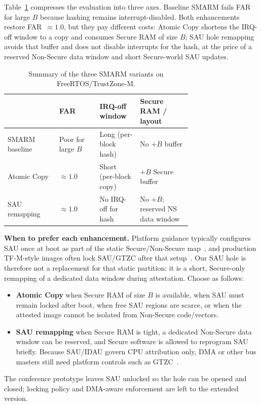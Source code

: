 \documentclass[conference]{IEEEtran}
\begin{document}
Table~\ref{tab:metric_summary} compresses the evaluation into three axes.
Baseline SMARM fails FAR for large $B$ because hashing remains
interrupt-disabled. Both enhancements restore FAR~$\approx 1.0$, but they
pay different costs: Atomic Copy shortens the IRQ-off window to a copy
and consumes Secure RAM of size $B$; SAU hole remapping avoids that
buffer and does not disable interrupts for the hash, at the price of a
reserved Non-Secure data window and short Secure-world SAU updates.

\begin{table}[!t]
  \centering
  \small
  \caption{Summary of the three SMARM variants on FreeRTOS/TrustZone-M.}
  \label{tab:metric_summary}
  \setlength{\tabcolsep}{2.8pt}
  \renewcommand{\arraystretch}{1.15}
  \begin{tabular}{lp{0.22\linewidth}p{0.22\linewidth}p{0.28\linewidth}}
    \toprule
    & \textbf{FAR} & \textbf{IRQ-off window} & \textbf{Secure RAM / layout} \\
    \midrule
    SMARM baseline &
      Poor for large $B$ &
      Long (per-block hash) &
      No $+B$ buffer \\
    Atomic Copy &
      $\approx 1.0$ &
      Short (per-block copy) &
      $+B$ Secure buffer \\
    SAU remapping &
      $\approx 1.0$ &
      No IRQ-off for hash &
      No $+B$; reserved NS data window \\
    \bottomrule
  \end{tabular}
\end{table}

\textbf{When to prefer each enhancement.}
Platform guidance typically configures SAU once at boot as part of the
static Secure/Non-Secure map~\cite{armv8m-arm,an5347,cmsis-tz,tfm-isolation},
and production TF-M-style images often lock SAU/GTZC after that
setup~\cite{um2851,tfm2024}. Our SAU hole is therefore not a replacement
for that static partition: it is a short, Secure-only remapping of a
dedicated data window during attestation. Choose as follows:

\begin{itemize}
  \item \textbf{Atomic Copy} when Secure RAM of size $B$ is available,
    when SAU must remain locked after boot, when free SAU regions are
    scarce, or when the attested image cannot be isolated from Non-Secure
    code/vectors.
  \item \textbf{SAU remapping} when Secure RAM is tight, a dedicated
    Non-Secure data window can be reserved, and Secure software is
    allowed to reprogram SAU briefly. Because SAU/IDAU govern CPU
    attribution only, DMA or other bus masters still need platform
    controls such as GTZC~\cite{an5347}.
\end{itemize}
The conference prototype leaves SAU unlocked so the hole can be opened
and closed; locking policy and DMA-aware enforcement are left to the
extended version.
\end{document}

